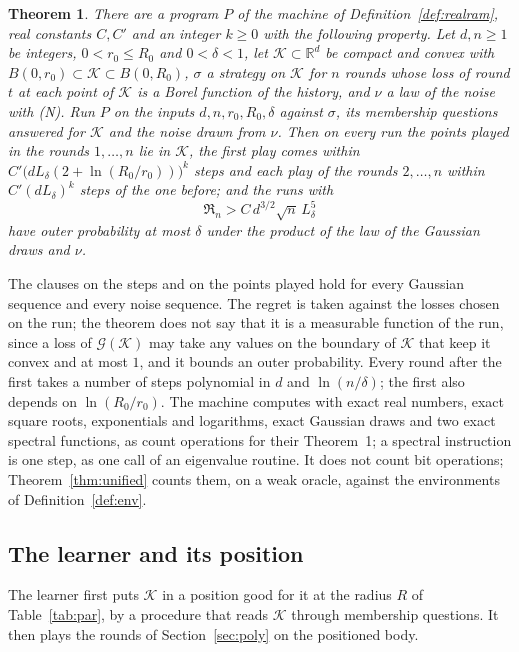 \documentclass[11pt]{amsart}
\newtheorem{theorem}{Theorem}[section]
\theoremstyle{definition}
\numberwithin{equation}{section}
\newcommand{\R}{\mathbb{R}}
\newcommand{\cK}{\mathcal{K}}
\newcommand{\cG}{\mathscr{G}}
\newcommand{\Reg}{\mathfrak{R}}
\begin{document}
\begin{theorem}\label{thm:body}
There are a program $P$ of the machine of Definition~\ref{def:realram}, real constants $C,C'$ and an integer $k\ge0$ with the following property. Let $d,n\ge1$ be integers, $0<r_0\le R_0$ and $0<\delta<1$, let $\cK\subset\R^d$ be compact and convex with $B(0,r_0)\subset\cK\subset B(0,R_0)$, $\sigma$ a strategy on $\cK$ for $n$ rounds whose loss of round $t$ at each point of $\cK$ is a Borel function of the history, and $\nu$ a law of the noise with (N). Run $P$ on the inputs $d,n,r_0,R_0,\delta$ against $\sigma$, its membership questions answered for $\cK$ and the noise drawn from $\nu$. Then on every run the points played in the rounds $1,\dots,n$ lie in $\cK$, the first play comes within $C'\bigl(dL_\delta(2+\ln(R_0/r_0))\bigr)^k$ steps and each play of the rounds $2,\dots,n$ within $C'(dL_\delta)^k$ steps of the one before; and the runs with
\[
\Reg_n>C\,d^{3/2}\sqrt n\,L_\delta^5
\]
have outer probability at most $\delta$ under the product of the law of the Gaussian draws and $\nu$.
\end{theorem}

The clauses on the steps and on the points played hold for every Gaussian sequence and every noise sequence. The regret is taken against the losses chosen on the run; the theorem does not say that it is a measurable function of the run, since a loss of $\cG(\cK)$ may take any values on the boundary of $\cK$ that keep it convex and at most $1$, and it bounds an outer probability. Every round after the first takes a number of steps polynomial in $d$ and $\ln(n/\delta)$; the first also depends on $\ln(R_0/r_0)$. The machine computes with exact real numbers, exact square roots, exponentials and logarithms, exact Gaussian draws and two exact spectral functions, as \cite[Section~6.1]{BEL21} count operations for their Theorem~1; a spectral instruction is one step, as one call of an eigenvalue routine. It does not count bit operations; Theorem~\ref{thm:unified} counts them, on a weak oracle, against the environments of Definition~\ref{def:env}.

\subsection{The learner and its position}\label{sec:body-learner}

The learner first puts $\cK$ in a position good for it at the radius $R$ of Table~\ref{tab:par}, by a procedure that reads $\cK$ through membership questions. It then plays the rounds of Section~\ref{sec:poly} on the positioned body.
\end{document}
